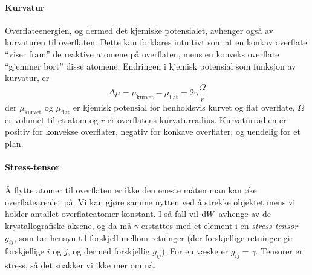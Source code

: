 \paragraph{Kurvatur} Overflateenergien, og dermed det kjemiske potensialet, avhenger også av kurvaturen til overflaten. Dette kan forklares intuitivt som at en konkav overflate ``viser fram'' de reaktive atomene på overflaten, mens en konveks overflate ``gjemmer bort'' disse atomene. Endringen i kjemisk potensial som funksjon av kurvatur, er
\begin{equation}
	\Delta \mu = \mu_{\text{kurvet}} - \mu_{\text{flat}} = 2\gamma\frac{\Omega}{r}
\end{equation}
der $\mu_{\text{kurvet}}$ og $\mu_{\text{flat}}$ er kjemisk potensial for henholdsvis kurvet og flat overflate, $\Omega$ er volumet til et atom og $r$ er overflatens kurvaturradius. Kurvaturradien er positiv for konvekse overflater, negativ for konkave overflater, og uendelig for et plan.

\paragraph{Stress-tensor} Å flytte atomer til overflaten er ikke den eneste måten man kan øke overflatearealet på. Vi kan gjøre samme nytten ved å strekke objektet mens vi holder antallet overflateatomer konstant. I så fall vil $\text{d}W$ avhenge av de krystallografiske aksene, og da må $\gamma$ erstattes med et element i en \emph{stress-tensor} $g_{ij}$, som tar hensyn til forskjell mellom retninger (der forskjellige retninger gir forskjellige $i$ og $j$, og dermed forskjellig $g_{ij}$). For en væske er $g_{ij}=\gamma$. Tensorer er stress, så det snakker vi ikke mer om nå.

